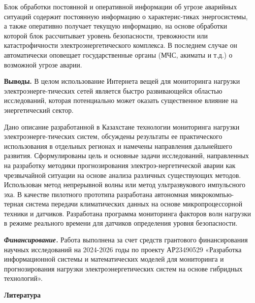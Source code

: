 \begin{multicols}{2}
Блок обработки постоянной и оперативной информации об угрозе аварийных
ситуаций содержит постоянную информацию о характерис-тиках энергосистемы,
а также оперативно получает текущую информацию, на основе обработки
которой блок рассчитывает уровень безопасности, тревожности или
катастрофичности электроэнергетического комплекса. В последнем случае он
автоматически оповещает государственные органы (МЧС, акиматы и т.д.) о
возможной угрозе аварии.

{\bfseries Выводы.} В целом использование Интернета вещей для мониторинга
нагрузки электроэнерге-тических сетей является быстро развивающейся
областью исследований, которая потенциально может оказать существенное
влияние на энергетический сектор.

Дано описание разработанной в Казахстане технологии мониторинга нагрузки
электроэнерге-тических систем, обсуждены результаты ее практического
использования в отдельных регионах и намечены направления дальнейшего
развития. Сформулированы цель и основные задачи исследований,
направленных на разработку методики прогнозирования
электроэ-нергетической аварии как чрезвычайной ситуации на основе анализа
различных существующих методов. Использован метод непрерывной волны или
метод ультразвукового импульсного эха. В качестве пилотного прототипа
разработана автономная микрокомпью-терная система передачи климатических
данных на основе микропроцессорной техники и датчиков. Разработана
программа мониторинга факторов волн нагрузки в режиме реального времени
для датчиков определения уровня безопасности.

\emph{{\bfseries Финансирование.}} Работа выполнена за счет средств
грантового финансирования научных исследований на 2024-2026 годы по
проекту АР23490529 «Разработка информационной системы и математических
моделей для мониторинга и прогнозирования нагрузки электроэнергетических
систем на основе гибридных технологий».

\end{multicols}


\begin{center}
  {\bfseries Литература}
  \end{center}
  

